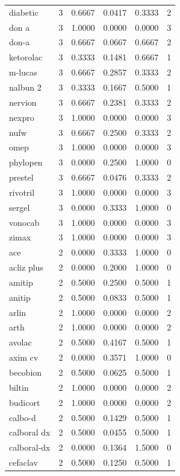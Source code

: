 \begin{longtable}{p{3.0cm}rrrrr}
diabetic & 3 & 0.6667 & 0.0417 & 0.3333 & 2 \\
don a & 3 & 1.0000 & 0.0000 & 0.0000 & 3 \\
don-a & 3 & 0.6667 & 0.0667 & 0.6667 & 2 \\
ketorolac & 3 & 0.3333 & 0.1481 & 0.6667 & 1 \\
m-lucas & 3 & 0.6667 & 0.2857 & 0.3333 & 2 \\
nalbun 2 & 3 & 0.3333 & 0.1667 & 0.5000 & 1 \\
nervion & 3 & 0.6667 & 0.2381 & 0.3333 & 2 \\
nexpro & 3 & 1.0000 & 0.0000 & 0.0000 & 3 \\
nufw & 3 & 0.6667 & 0.2500 & 0.3333 & 2 \\
omep & 3 & 1.0000 & 0.0000 & 0.0000 & 3 \\
phylopen & 3 & 0.0000 & 0.2500 & 1.0000 & 0 \\
prestel & 3 & 0.6667 & 0.0476 & 0.3333 & 2 \\
rivotril & 3 & 1.0000 & 0.0000 & 0.0000 & 3 \\
sergel & 3 & 0.0000 & 0.3333 & 1.0000 & 0 \\
vonocab & 3 & 1.0000 & 0.0000 & 0.0000 & 3 \\
zimax & 3 & 1.0000 & 0.0000 & 0.0000 & 3 \\
ace & 2 & 0.0000 & 0.3333 & 1.0000 & 0 \\
acliz plus & 2 & 0.0000 & 0.2000 & 1.0000 & 0 \\
amitip & 2 & 0.5000 & 0.2500 & 0.5000 & 1 \\
anitip & 2 & 0.5000 & 0.0833 & 0.5000 & 1 \\
arlin & 2 & 1.0000 & 0.0000 & 0.0000 & 2 \\
arth & 2 & 1.0000 & 0.0000 & 0.0000 & 2 \\
avolac & 2 & 0.5000 & 0.4167 & 0.5000 & 1 \\
axim cv & 2 & 0.0000 & 0.3571 & 1.0000 & 0 \\
becobion & 2 & 0.5000 & 0.0625 & 0.5000 & 1 \\
biltin & 2 & 1.0000 & 0.0000 & 0.0000 & 2 \\
budicort & 2 & 1.0000 & 0.0000 & 0.0000 & 2 \\
calbo-d & 2 & 0.5000 & 0.1429 & 0.5000 & 1 \\
calboral dx & 2 & 0.5000 & 0.0455 & 0.5000 & 1 \\
calboral-dx & 2 & 0.0000 & 0.1364 & 1.5000 & 0 \\
cefaclav & 2 & 0.5000 & 0.1250 & 0.5000 & 1 \\

\end{longtable}
